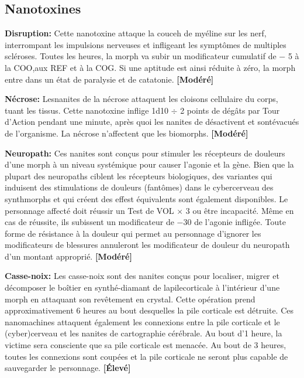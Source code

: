 \subsection{Nanotoxines} \label{sec:nanotoxins} 

\textbf{Disruption:} Cette nanotoxine attaque la couceh de myéline sur les nerf, interrompant les impulsions nerveuses et infligeant les symptômes de multiples scléroses. Toutes les heures, la morph va subir un modificateur cumulatif de $-$ 5 à la COO,aux REF et à la COG. Si une aptitude est ainsi réduite à zéro, la morph entre dans un état de paralysie et de catatonie. \textbf{[Modéré]} 

\textbf{Nécrose:} Lesnanites de la nécrose attaquent les cloisons cellulaire du corps, tuant les tissus. Cette nanotoxine inflige 1d10 $\div$ 2 points de dégâts par Tour d'Action pendant une minute, après quoi les nanites de désactivent et sontévacués de l'organisme. La nécrose n'affectent que les biomorphs. \textbf{[Modéré]} 

\textbf{Neuropath:} Ces nanites sont conçus pour stimuler les récepteurs de douleurs d'une morph à un niveau systémique pour causer l'agonie et la gène. Bien que la plupart des neuropaths ciblent les récepteurs biologiques, des variantes qui induisent des stimulations de douleurs (fantômes) dans le cybercerveau des synthmorphs et qui créent des effest équivalents sont également disponibles. Le personnage affecté doit réussir un Test de VOL $\times$ 3 ou être incapacité. Même en cas de réussite, ils subissent un modificateur de $-$30 de l'agonie infligée. Toute forme de résistance à la douleur qui permet au personnage d'ignorer les modificateurs de blessures annuleront les modificateur de douleur du neuropath d'un montant approprié. \textbf{[Modéré]} 

\textbf{Casse-noix:} Les casse-noix sont des nanites conçus pour localiser, migrer et décomposer le boîtier en synthé-diamant de lapilecorticale à l'intérieur d'une morph en attaquant son revêtement en crystal. Cette opération prend approximativement 6 heures au bout desquelles la pile corticale est détruite. Ces nanomachines attaquent également les connexions entre la pile corticale et le (cyber)cerveau et les nanites de cartographie cérébrale. Au bout d'1 heure, la victime sera consciente que sa pile corticale est menacée. Au bout de 3 heures, toutes les connexions sont coupées et la pile corticale ne seront plus capable de sauvegarder le personnage. \textbf{[Élevé]} 



